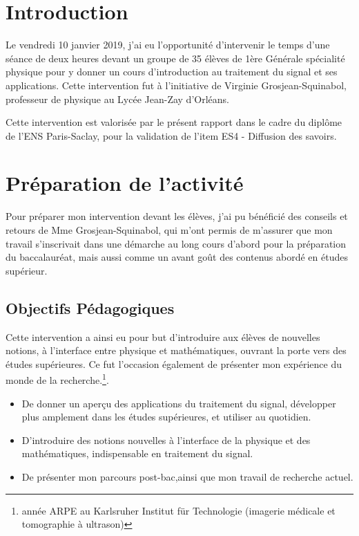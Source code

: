 \documentclass[12pt]{article}
\begin{document}
\section{Introduction}

Le vendredi 10 janvier 2019, j'ai eu l'opportunité d'intervenir le temps d'une séance de deux heures devant un groupe de 35 élèves de 1ère Générale spécialité physique pour y donner un cours d'introduction au traitement du signal et ses applications. Cette intervention fut à l'initiative de Virginie Grosjean-Squinabol, professeur de physique au Lycée Jean-Zay d'Orléans.

Cette intervention est valorisée par le présent rapport dans le cadre du diplôme de l'ENS Paris-Saclay, pour la validation de l'item ES4 - Diffusion des savoirs.

\section{Préparation de l'activité}

Pour préparer mon intervention devant les élèves, j'ai pu bénéficié des conseils et retours de Mme Grosjean-Squinabol, qui m'ont permis de m'assurer que mon travail s'inscrivait dans une démarche au long cours d'abord pour la préparation du baccalauréat, mais aussi comme un avant goût des contenus abordé en études supérieur.
\subsection{Objectifs Pédagogiques}
Cette intervention a ainsi eu pour but d'introduire aux élèves de nouvelles notions, à l'interface entre physique et mathématiques, ouvrant la porte vers des études supérieures. Ce fut l'occasion également de présenter mon expérience du monde de la recherche.\footnote{année ARPE au Karlsruher Institut für Technologie (imagerie médicale et tomographie à ultrason)}.
\begin{itemize}
  \item De donner un aperçu des applications du traitement du signal, développer plus amplement dans les études supérieures, et utiliser au quotidien.
  \item D'introduire des notions nouvelles à l'interface de la physique et des mathématiques, indispensable en traitement du signal.
  \item De présenter mon parcours post-bac,ainsi que mon travail de recherche actuel.
\end{itemize}
\end{document}
